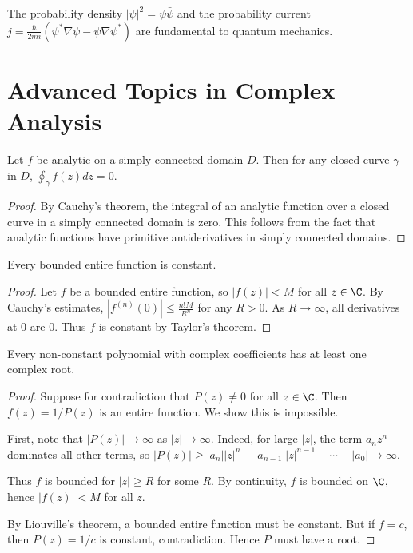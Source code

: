 \begin{example}
\label{ex:quantum-mech}
The probability density $|\psi|^2 = \psi \bar{\psi}$ and the probability current $j = \frac{\hbar}{2mi}(\psi^* \nabla \psi - \psi \nabla \psi^*)$ are fundamental to quantum mechanics.

\end{example}

\section{Advanced Topics in Complex Analysis}
\label{sec:advanced-complex-anal}

\begin{theorem}
\label{thm:cauchy-integral}
Let $f$ be analytic on a simply connected domain $D$. Then for any closed curve $\gamma$ in $D$, $\oint_\gamma f(z)dz = 0$.

\begin{proof}
By Cauchy's theorem, the integral of an analytic function over a closed curve in a simply connected domain is zero. This follows from the fact that analytic functions have primitive antiderivatives in simply connected domains.
\end{proof}

\end{theorem}

\begin{theorem}
\label{thm:liouville}
Every bounded entire function is constant.

\begin{proof}
Let $f$ be a bounded entire function, so $|f(z)| < M$ for all $z \in \C$. By Cauchy's estimates, $|f^{(n)}(0)| \leq \frac{n!M}{R^n}$ for any $R > 0$. As $R \to \infty$, all derivatives at 0 are 0. Thus $f$ is constant by Taylor's theorem.
\end{proof}

\end{theorem}

\begin{theorem}
\label{thm:fta}
Every non-constant polynomial with complex coefficients has at least one complex root.

\begin{proof}
Suppose for contradiction that $P(z) \neq 0$ for all $z \in \C$. Then $f(z) = 1/P(z)$ is an entire function. We show this is impossible.

First, note that $|P(z)| \to \infty$ as $|z| \to \infty$. Indeed, for large $|z|$, the term $a_n z^n$ dominates all other terms, so $|P(z)| \geq |a_n||z|^n - |a_{n-1}||z|^{n-1} - \cdots - |a_0| \to \infty$.

Thus $f$ is bounded for $|z| \geq R$ for some $R$. By continuity, $f$ is bounded on $\C$, hence $|f(z)| < M$ for all $z$.

By Liouville's theorem, a bounded entire function must be constant. But if $f = c$, then $P(z) = 1/c$ is constant, contradiction. Hence $P$ must have a root.
\end{proof}

\end{theorem}

